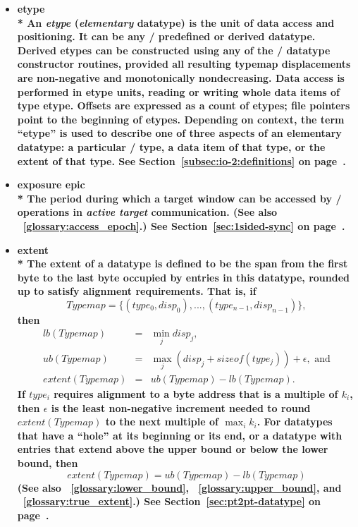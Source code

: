 \begin{itemize}
\label{glossary:etype}
\item \bf{ etype} \\* 
An {\it etype} ({\it elementary} datatype)
is the unit of data access and positioning.
It can be any \MPI/ predefined or derived datatype.
Derived etypes can be constructed
using any of the \MPI/ datatype constructor routines,
provided all resulting typemap displacements are non-negative
and monotonically nondecreasing.
Data access is performed in etype units,
reading or writing whole data items of type etype.
Offsets are expressed as a count of etypes;
file pointers point to the beginning of etypes.
Depending on context,
the term ``etype'' is used to describe one of three aspects
of an elementary datatype:
a particular \MPI/ type,
a data item of that type,
or the extent of that type.
See Section~\ref{subsec:io-2:definitions} on page~\pageref{subsec:io-2:definitions}.

\label{glossary:exposure_epic}
\item \bf{ exposure epic} \\*
The period during which a target window can be accessed by \RMA/
operations in {\it active target} communication.
(See also ~\ref{glossary:access_epoch}.)
See Section~\ref{sec:1sided-sync} on page~\pageref{sec:1sided-sync}.

\label{glossary:extent}
\item \bf{ extent} \\*
The {\bf extent} of a datatype is defined to
be the span from the first byte to the last byte occupied by entries in this
datatype, rounded up to satisfy alignment requirements.
That is, if
\[
Typemap = \{ (type_0,disp_0), ..., (type_{n-1}, disp_{n-1}) \} ,
\]
then
\begin{eqnarray}
lb(Typemap) & = & \min_j disp_j , \nonumber \\
ub(Typemap) & = & \max_j (disp_j + sizeof(type_j)) + \epsilon , \mbox{ and}
\nonumber \\ extent(Typemap) & = & ub(Typemap) -lb(Typemap).
\end{eqnarray}
If $type_i$ requires alignment to a byte address that 
is
a multiple
of $k_i$,
then $\epsilon$ is the least non-negative increment needed to round
$extent(Typemap)$ to the next multiple of $\max_i k_i$.
For datatypes that 
have a ``hole'' at its beginning or its end, or a datatype with
entries that extend above the upper bound or below the lower bound, then
\label{eq:pt2pt-extent}
\[
extent(Typemap) = ub(Typemap) - lb(Typemap)
\]
(See also ~\ref{glossary:lower_bound}, ~\ref{glossary:upper_bound}, and ~\ref{glossary:true_extent}.)
See Section~\ref{sec:pt2pt-datatype} on page~\pageref{sec:pt2pt-datatype}.


\end{itemize}
